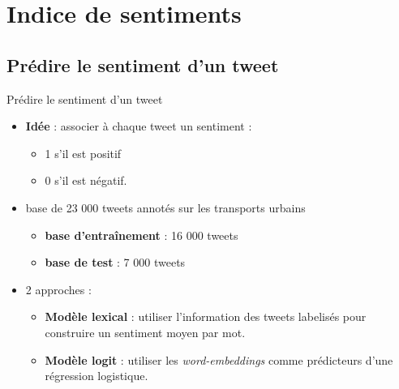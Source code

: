 \documentclass[10pt,xcolor=table,color={dvipsnames,usenames},ignorenonframetext,usepdftitle=false,french]{beamer}
\providecommand{\tightlist}{%
  \setlength{\parskip}{0pt}
  }
\begin{document}
\hypertarget{indice-de-sentiments}{%
\section{Indice de sentiments}\label{indice-de-sentiments}}

\hypertarget{pruxe9dire-le-sentiment-dun-tweet}{%
\subsection{Prédire le sentiment d’un
tweet}\label{pruxe9dire-le-sentiment-dun-tweet}}

\begin{frame}{Prédire le sentiment d’un tweet}
\protect\hypertarget{pruxe9dire-le-sentiment-dun-tweet-1}{}

\begin{itemize}
\tightlist
\item
  \textbf{Idée} : associer à chaque tweet un sentiment :

  \begin{itemize}
  \tightlist
  \item
    1 s’il est positif
  \item
    0 s’il est négatif.
  \end{itemize}
\end{itemize}

\medskip

\begin{itemize}
\tightlist
\item
  base de 23 000 tweets annotés sur les transports urbains

  \begin{itemize}
  \tightlist
  \item
    \textbf{base d’entraînement} : 16 000 tweets
  \item
    \textbf{base de test} : 7 000 tweets
  \end{itemize}
\end{itemize}

\medskip

\begin{itemize}
\tightlist
\item
  2 approches :

  \begin{itemize}
  \tightlist
  \item
    \textbf{Modèle lexical} : utiliser l’information des tweets
    labelisés pour construire un sentiment moyen par mot.
  \item
    \textbf{Modèle logit} : utiliser les \emph{word-embeddings} comme
    prédicteurs d’une régression logistique.
  \end{itemize}
\end{itemize}

\end{frame}
\end{document}
